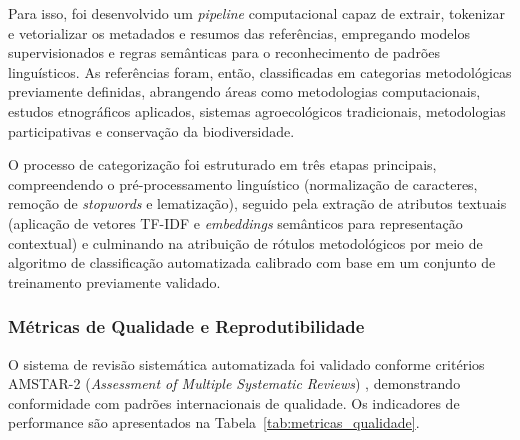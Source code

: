 Para isso, foi desenvolvido um \textit{pipeline} computacional capaz de extrair, tokenizar e vetorializar os metadados e resumos das referências, empregando modelos supervisionados e regras semânticas para o reconhecimento de padrões linguísticos. As referências foram, então, classificadas em categorias metodológicas previamente definidas, abrangendo áreas como metodologias computacionais, estudos etnográficos aplicados, sistemas agroecológicos tradicionais, metodologias participativas e conservação da biodiversidade.

O processo de categorização foi estruturado em três etapas principais, compreendendo o pré-processamento linguístico (normalização de caracteres, remoção de \textit{stopwords} e lematização), seguido pela extração de atributos textuais (aplicação de vetores TF-IDF e \textit{embeddings} semânticos para representação contextual) e culminando na atribuição de rótulos metodológicos por meio de algoritmo de classificação automatizada calibrado com base em um conjunto de treinamento previamente validado.


\subsubsection{Métricas de Qualidade e Reprodutibilidade}

O sistema de revisão sistemática automatizada foi validado conforme critérios AMSTAR-2 (\textit{Assessment of Multiple Systematic Reviews}) \cite{Shea2007}, demonstrando conformidade com padrões internacionais de qualidade. Os indicadores de performance são apresentados na Tabela~\ref{tab:metricas_qualidade}.

\begin{table}[H]
  \centering
  \caption{Métricas de qualidade do sistema de revisão sistemática automatizada}
  \label{tab:metricas_qualidade}
\end{table}

